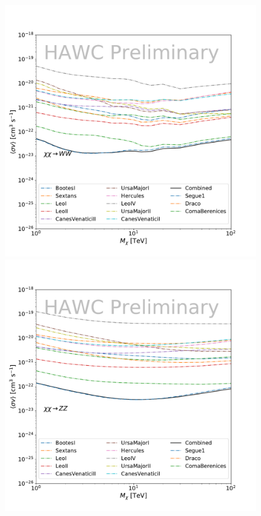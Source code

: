 \begin{figure}[ht]
{    \includegraphics[scale=0.21]{figures/glory_duck/hawc/Combined95_GD_ww.pdf}
    \includegraphics[scale=0.21]{figures/glory_duck/hawc/Combined95_GD_zz.pdf}
}
\end{figure}
